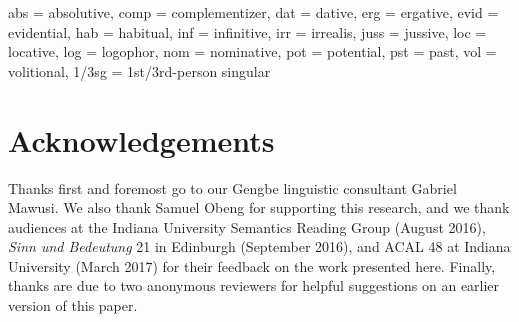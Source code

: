 \documentclass[output=paper
,modfonts
,nonflat]{langsci/langscibook}
\newcommand{\á}{\'{ã}}
\newcommand{\É}{\'{\~{ε}}}
\newcommand{\È}{\`{\~{ε}}}
\newcommand{\í}{\'{\~{i}}}
\newcommand{\ì}{\`{\~{i}}}
\newcommand{\Ó}{\'{\~{ɔ}}}
\newcommand{\Ò}{\`{\~{ɔ}}}
\newcommand{\ú}{\'{ũ}}
\newcommand{\ù}{\`{ũ}}
\begin{document}
{\sc abs} = absolutive, {\sc comp} = complementizer, {\sc dat} = dative, {\sc erg} = ergative, {\sc evid}  = evidential, {\sc hab} = habitual, {\sc inf} = infinitive, {\sc irr} = irrealis,  {\sc juss} = jussive, {\sc loc} = locative, {\sc log} = logophor, {\sc nom} = nominative, {\sc pot} = potential, {\sc pst} = past, {\sc vol} = volitional, 1/3{\sc sg} = 1st/3rd-person singular
 
\section*{Acknowledgements}

Thanks first and foremost go to our Gengbe linguistic consultant Gabriel Mawusi. We also thank Samuel Obeng for supporting this research, and we thank audiences at the Indiana University Semantics Reading Group (August 2016), {\em Sinn und Bedeutung} 21 in Edinburgh (September 2016), and ACAL 48 at Indiana University (March 2017) for their feedback on the work presented here. Finally, thanks are due to two anonymous reviewers for helpful suggestions on an earlier version of this paper.

\printbibliography[heading=subbibliography,notkeyword=this]
\end{document}
